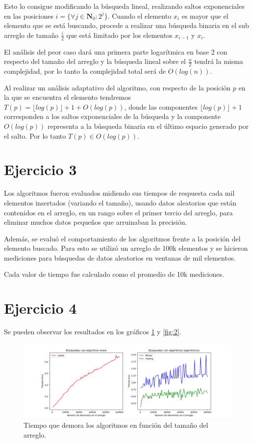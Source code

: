 \documentclass[]{article}
\begin{document}
Esto lo consigue modificando la búsqueda lineal, realizando saltos exponenciales en las posiciones $i = \{ \forall j \in \mathbf{N}_{0} : 2^j \}$. Cuando el elemento $x_{i}$ es mayor que el elemento que se está buscando, procede a realizar una búsqueda binaria en el sub arreglo de tamaño $\frac{i}{2}$ que está limitado por los elementos $x_{i-1}$ y $x_{i}$.

El análisis del peor caso dará una primera parte logarítmica en base 2 con respecto del tamaño del arreglo y la búsqueda lineal sobre el $\frac{n}{2}$ tendrá la misma complejidad, por lo tanto la complejidad total será de $O(log(n))$.

Al realizar un análisis adaptativo del algoritmo, con respecto de la posición $p$ en la que se encuentra el elemento tendremos $T(p) = \lfloor log(p) \rfloor + 1 + O(log(p))$, donde las componentes $\lfloor log(p) \rfloor + 1$ corresponden a los saltos exponenciales de la búsqueda y la componente $O(log(p))$ representa a la búsqueda binaria en el último espacio generado por el salto. Por lo tanto $T(p) \in O(log(p))$.

\section{Ejercicio 3}

Los algoritmos fueron evaluados midiendo sus tiempos de respuesta cada mil elementos insertados (variando el tamaño), usando datos aleatorios que están contenidos en el arreglo, en un rango sobre el primer tercio del arreglo, para eliminar muchos datos pequeños que arruinaban la precisión.

Además, se evaluó el comportamiento de los algoritmos frente a la posición del elemento buscado. Para esto se utilizó un arreglo de 100k elementos y se hicieron mediciones para búsquedas de datos aleatorios en ventanas de mil elementos.

Cada valor de tiempo fue calculado como el promedio de 10k mediciones.

\section{Ejercicio 4}

Se pueden observar los resultados en los gráficos \ref{fig:1} y \ref{fig:2}.

\begin{figure}[tb]
	\centering
	\includegraphics[width=1\textwidth]{Busqueda por tamanio}
	\caption{Tiempo que demora los algoritmos en función del tamaño del arreglo.}
	\label{fig:1}
\end{figure}
\end{document}
